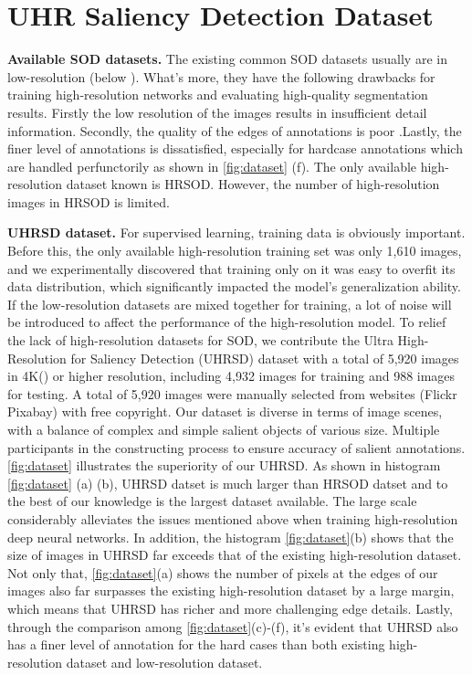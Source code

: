 \documentclass[10pt,twocolumn,letterpaper]{article}
\begin{document}
\section{UHR Saliency Detection Dataset}
\textbf{Available SOD datasets.} The existing common SOD datasets usually are in low-resolution (below  ). What's more, they have the following drawbacks for training high-resolution networks and evaluating high-quality segmentation results. Firstly the low resolution of the images results in insufficient detail information. Secondly, the quality of the edges of annotations is poor\cite{zeng2019towards} .Lastly, the finer level of annotations is dissatisfied, especially for hardcase annotations which are handled perfunctorily as shown in \cref{fig:dataset} (f).  The only available high-resolution dataset known is HRSOD\cite{zeng2019towards}. However, the number of high-resolution images
 in HRSOD is limited.

\textbf{UHRSD dataset.} For supervised learning, training data is obviously important. Before this, the only available high-resolution training set was only 1,610 images, and we experimentally discovered that training only on it was easy to overfit its data distribution, which significantly impacted the model's generalization ability. If the low-resolution datasets are mixed together for training, a lot of noise will be introduced to affect the performance of the high-resolution model. To relief the lack of high-resolution datasets for SOD, we contribute the Ultra High-Resolution for Saliency Detection (UHRSD) dataset with a total of 5,920 images in 4K() or higher resolution, including 4,932 images for training and 988 images for testing. A total of 5,920 images were manually selected from websites (\eg Flickr Pixabay) with free copyright. Our dataset is diverse in terms of image scenes, with a balance of complex and simple salient objects of various size. Multiple participants in the constructing process to ensure accuracy of salient annotations. \cref{fig:dataset} illustrates the superiority of our UHRSD.  As shown in histogram \cref{fig:dataset} (a) (b), UHRSD datset is much larger than HRSOD datset and to the best of our knowledge is the largest dataset available. The large scale considerably alleviates the issues mentioned above when training high-resolution deep neural networks. In addition, the histogram \cref{fig:dataset}(b) shows that the size of images in UHRSD far exceeds that of the existing high-resolution dataset. Not only that, \cref{fig:dataset}(a) shows the number of pixels at the edges of our images also far surpasses the existing high-resolution dataset by a large margin, which means that UHRSD has richer and more challenging edge details. Lastly, through the comparison among \cref{fig:dataset}(c)-(f), it's evident that UHRSD also has a finer level of annotation for the hard cases than both existing high-resolution dataset and low-resolution dataset.
\end{document}
